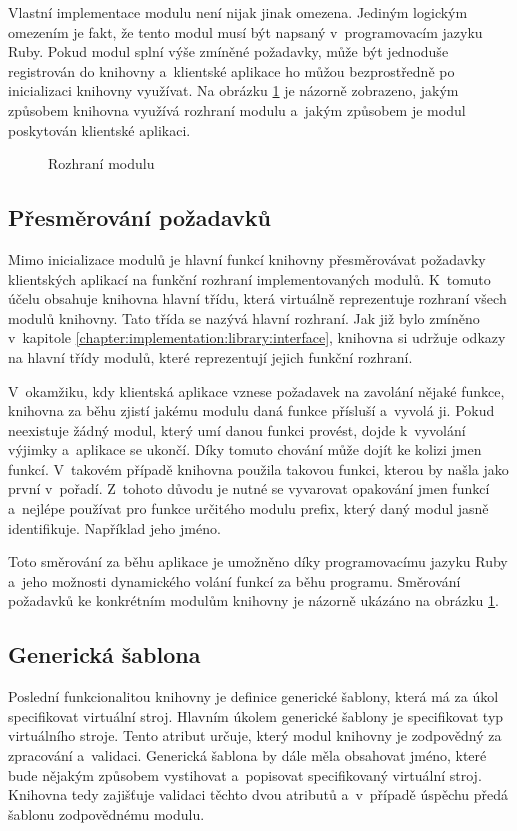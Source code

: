 Vlastní implementace modulu není nijak jinak omezena. Jediným logickým omezením je fakt, že tento modul musí být napsaný
v~programovacím jazyku Ruby. Pokud modul splní výše zmíněné požadavky, může být jednoduše registrován do knihovny a~klientské
aplikace ho můžou bezprostředně po inicializaci knihovny využívat. Na obrázku \ref{figure:module:interface} je názorně zobrazeno, 
jakým způsobem knihovna využívá rozhraní modulu a~jakým způsobem je modul poskytován klientské aplikaci.
\begin{figure}
    \centering    
    \caption{Rozhraní modulu}
    \label{figure:module:interface}
\end{figure}
\subsection{Přesměrování požadavků}
\label{chapter:implementation:library:routing}
Mimo inicializace modulů je hlavní funkcí knihovny přesměrovávat požadavky klientských aplikací na funkční rozhraní 
implementovaných modulů. K~tomuto účelu obsahuje knihovna hlavní třídu, která virtuálně reprezentuje rozhraní všech modulů
knihovny. Tato třída se nazývá hlavní rozhraní. Jak již bylo zmíněno v~kapitole \ref{chapter:implementation:library:interface},
knihovna si udržuje odkazy na hlavní třídy modulů, které reprezentují jejich funkční rozhraní.

V~okamžiku, kdy klientská aplikace vznese požadavek na zavolání nějaké funkce, knihovna za běhu zjistí jakému modulu daná
funkce přísluší a~vyvolá ji. Pokud neexistuje žádný modul, který umí danou funkci provést, dojde k~vyvolání výjimky a~aplikace
se ukončí. Díky tomuto chování může dojít ke kolizi jmen funkcí. V~takovém případě knihovna použila takovou funkci, kterou
by našla jako první v~pořadí. Z~tohoto důvodu je nutné se vyvarovat opakování jmen funkcí a~nejlépe používat pro funkce určitého
modulu prefix, který daný modul jasně identifikuje. Například jeho jméno.

Toto směrování za běhu aplikace je umožněno díky programovacímu jazyku Ruby a~jeho možnosti dynamického volání funkcí za běhu
programu. Směrování požadavků ke konkrétním modulům knihovny je názorně ukázáno na obrázku \ref{figure:module:interface}.
\subsection{Generická šablona}
\label{chapter:implementation:library:generic}
Poslední funkcionalitou knihovny je definice generické šablony, která má za úkol specifikovat virtuální stroj. Hlavním úkolem
generické šablony je specifikovat typ virtuálního stroje. Tento atribut určuje, který modul knihovny je zodpovědný
za zpracování a~validaci. Generická šablona by dále měla obsahovat jméno, které bude nějakým způsobem vystihovat a~popisovat
specifikovaný virtuální stroj. Knihovna tedy zajišťuje validaci těchto dvou atributů a~v~případě úspěchu předá
šablonu zodpovědnému modulu.

